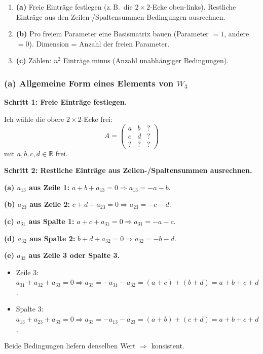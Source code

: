 \documentclass[a4paper,12pt]{article}
\begin{document}
\begin{wastun}
\begin{enumerate}[leftmargin=*, nosep]
    \item \textbf{(a)} Freie Eintr\"age festlegen (z.\,B.\ die $2\times 2$-Ecke oben-links). Restliche Eintr\"age aus den Zeilen-/Spaltensummen-Bedingungen ausrechnen.
    \item \textbf{(b)} Pro freiem Parameter eine Basismatrix bauen (Parameter $= 1$, andere $= 0$). Dimension = Anzahl der freien Parameter.
    \item \textbf{(c)} Z\"ahlen: $n^2$ Eintr\"age minus (Anzahl unabh\"angiger Bedingungen).
\end{enumerate}
\end{wastun}

\subsubsection*{(a) Allgemeine Form eines Elements von $W_3$}

\textbf{Schritt 1: Freie Eintr\"age festlegen.}

Ich w\"ahle die obere $2 \times 2$-Ecke frei:
\[
A = \begin{pmatrix} a & b & ? \\ c & d & ? \\ ? & ? & ? \end{pmatrix}
\]
mit $a, b, c, d \in \mathbb{R}$ frei.

\textbf{Schritt 2: Restliche Eintr\"age aus Zeilen-/Spaltensummen ausrechnen.}

\textbf{(a) $a_{13}$ aus Zeile 1:} $a + b + a_{13} = 0 \Rightarrow a_{13} = -a - b$.

\textbf{(b) $a_{23}$ aus Zeile 2:} $c + d + a_{23} = 0 \Rightarrow a_{23} = -c - d$.

\textbf{(c) $a_{31}$ aus Spalte 1:} $a + c + a_{31} = 0 \Rightarrow a_{31} = -a - c$.

\textbf{(d) $a_{32}$ aus Spalte 2:} $b + d + a_{32} = 0 \Rightarrow a_{32} = -b - d$.

\textbf{(e) $a_{33}$ aus Zeile 3 oder Spalte 3.}
\begin{itemize}[leftmargin=*, nosep]
\item Zeile 3: $a_{31} + a_{32} + a_{33} = 0 \Rightarrow a_{33} = -a_{31} - a_{32} = (a+c) + (b+d) = a+b+c+d$.
\item Spalte 3: $a_{13} + a_{23} + a_{33} = 0 \Rightarrow a_{33} = -a_{13} - a_{23} = (a+b) + (c+d) = a+b+c+d$. \checkmark
\end{itemize}
Beide Bedingungen liefern denselben Wert $\Rightarrow$ konsistent.
\end{document}
